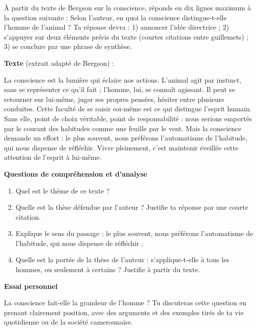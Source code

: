 \documentclass[11pt]{article}
\newcounter{popsec}
\newcounter{popsub}
\newcommand{\courssub}[1]{%
  \stepcounter{popsub}%
  \par\vspace{9pt}\noindent{\popxbold\fontsize{11.5}{13}\selectfont\color{popink}{\color{poporange}\thepopsec.\thepopsub}\hspace{6pt}#1}\par\nopagebreak\vspace{4pt}
}
\begin{document}
\begin{exercice}
À partir du texte de Bergson sur la conscience, réponds en dix lignes maximum à la question suivante : \og Selon l'auteur, en quoi la conscience distingue-t-elle l'homme de l'animal ? \fg
Ta réponse devra : 1) annoncer l'idée directrice ; 2) s'appuyer sur deux éléments précis du texte (courtes citations entre guillemets) ; 3) se conclure par une phrase de synthèse.
\end{exercice}

\courssub{Je me prépare au Bac}

\begin{exercice}
\textbf{Texte} (extrait adapté de Bergson) :

\og La conscience est la lumière qui éclaire nos actions. L'animal agit par instinct, sans se représenter ce qu'il fait ; l'homme, lui, se connaît agissant. Il peut se retourner sur lui-même, juger ses propres pensées, hésiter entre plusieurs conduites. Cette faculté de se saisir soi-même est ce qui distingue l'esprit humain. Sans elle, point de choix véritable, point de responsabilité : nous serions emportés par le courant des habitudes comme une feuille par le vent. Mais la conscience demande un effort : le plus souvent, nous préférons l'automatisme de l'habitude, qui nous dispense de réfléchir. Vivre pleinement, c'est maintenir éveillée cette attention de l'esprit à lui-même. \fg

\textbf{Questions de compréhension et d'analyse}
\begin{enumerate}
\item Quel est le thème de ce texte ?
\item Quelle est la thèse défendue par l'auteur ? Justifie ta réponse par une courte citation.
\item Explique le sens du passage : \og le plus souvent, nous préférons l'automatisme de l'habitude, qui nous dispense de réfléchir \fg.
\item Quelle est la portée de la thèse de l'auteur : s'applique-t-elle à tous les hommes, ou seulement à certains ? Justifie à partir du texte.
\end{enumerate}

\textbf{Essai personnel}

La conscience fait-elle la grandeur de l'homme ? Tu discuteras cette question en prenant clairement position, avec des arguments et des exemples tirés de ta vie quotidienne ou de la société camerounaise.
\end{exercice}
\end{document}
